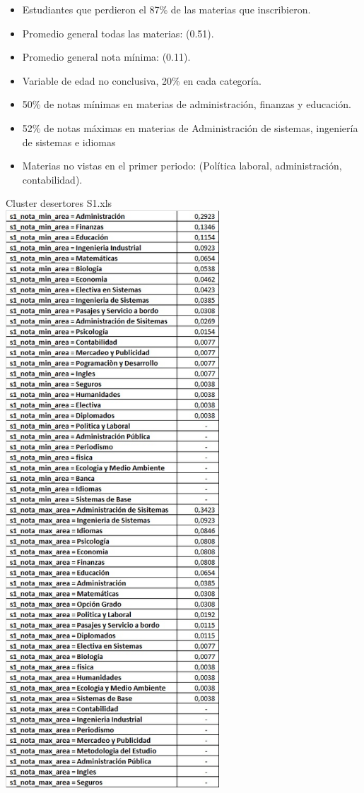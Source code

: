 \documentclass[fleqn,10pt]{SelfArx} %
\begin{document}
\begin{itemize}
	\item Estudiantes que perdieron el 87\% de las materias que inscribieron.
	\item Promedio general todas las materias: (0.51).
	\item Promedio general nota mínima: (0.11).
	\item Variable de edad no conclusiva, 20\% en cada categoría.
	\item 50\% de notas mínimas en materias de administración, finanzas y educación.
	\item 52\% de notas máximas en materias de Administración de sistemas, ingeniería de sistemas e idiomas
	\item Materias no vistas en el primer periodo: (Política laboral, administración, contabilidad).
\end{itemize}

Cluster desertores S1.xls\\
\includegraphics[width=8cm]{img/cluster-s1.jpg}\\ 
\end{document}
